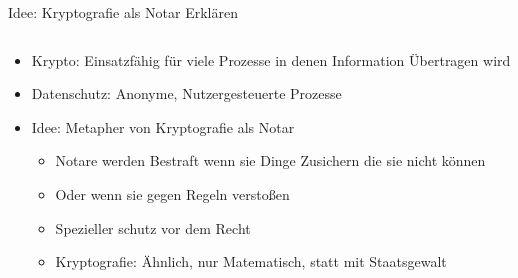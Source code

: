 \documentclass{rosenpass-beamer}
\begin{document}
\begin{frame}{Idee: Kryptografie als Notar Erklären}
\begin{columns}[c]

\begin{column}{0.7\textwidth}
  \begin{itemize}
    \item Krypto: Einsatzfähig für viele Prozesse in denen Information Übertragen wird
    \item Datenschutz: Anonyme, Nutzergesteuerte Prozesse
    \item Idee: Metapher von Kryptografie als Notar
      \begin{itemize}
        \item Notare werden Bestraft wenn sie Dinge Zusichern die sie nicht können
        \item Oder wenn sie gegen Regeln verstoßen
        \item Spezieller schutz vor dem Recht
        \item Kryptografie: Ähnlich, nur Matematisch, statt mit Staatsgewalt
      \end{itemize}
  \end{itemize}
\end{column}


\end{columns}
\end{frame}
\end{document}
